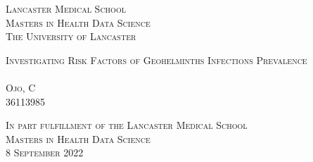 
\begin{titlepage}

        \begin{center}

            \vspace*{1cm}

            \begin{minipage}{0.95\textwidth}

                \begin{center}
                    {\sffamily \small \textsc{Lancaster Medical School\\Masters in Health Data Science\\The University of Lancaster}}
                    \vspace{3.5cm}

                    {\sffamily \Large \textsc{Investigating Risk Factors of Geohelminths Infections Prevalence}\\
                    \small \textsc{\\Ojo, C\\36113985}}
                    \vspace{11.5cm}

                    {\sffamily \small \textsc{In part fulfillment of the Lancaster Medical School\\ Masters in Health
                    Data Science \\ 8 September 2022}}

                \end{center}

            \end{minipage}

        \end{center}

\end{titlepage}